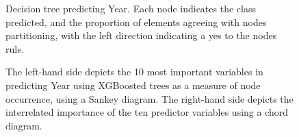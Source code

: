 \documentclass[review,12pt,authoryear]{elsarticle}
\begin{document}
\begin{linenumbers}
 \begin{figure}
  \caption{Decision tree predicting Year. Each node indicates the class predicted, and the proportion of elements agreeing with nodes partitioning, with the left direction indicating a yes to the nodes rule.}\label{fig:year_tree}
 \end{figure}
 
 \begin{figure}
  \caption{The left-hand side depicts the 10 most important variables in predicting Year using XGBoosted trees as a measure of node occurrence, using a Sankey diagram. The right-hand side depicts the interrelated importance of the ten predictor variables using a chord diagram.}\label{fig:year_sankey}
 \end{figure}


\end{linenumbers}
\end{document}
